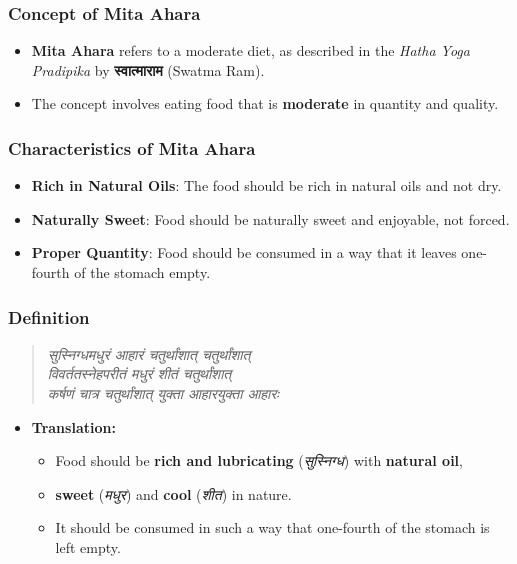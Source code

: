 \begin{frame}[fragile]\frametitle{Concept of Mita Ahara}
    \begin{itemize}
        \item \textbf{Mita Ahara} refers to a moderate diet, as described in the \textit{Hatha Yoga Pradipika} by \textbf{स्वात्माराम} (Swatma Ram).
        \item The concept involves eating food that is \textbf{moderate} in quantity and quality.
    \end{itemize}
\end{frame}

\begin{frame}[fragile]\frametitle{Characteristics of Mita Ahara}
    \begin{itemize}
        \item \textbf{Rich in Natural Oils}: The food should be rich in natural oils and not dry.
        \item \textbf{Naturally Sweet}: Food should be naturally sweet and enjoyable, not forced.
        \item \textbf{Proper Quantity}: Food should be consumed in a way that it leaves one-fourth of the stomach empty.
    \end{itemize}
\end{frame}

\begin{frame}[fragile]\frametitle{Definition}
    \begin{quote}
        \textit{सुस्निग्धमधुरं आहारं चतुर्थांशात् चतुर्थांशात् \\ 
        विवर्ततस्नेहपरीतं मधुरं शीतं चतुर्थांशात्} \\ 
        \textit{कर्षणं चात्र चतुर्थांशात् युक्ता आहारयुक्ता आहारः}
    \end{quote}
    \begin{itemize}
        \item \textbf{Translation:}
        \begin{itemize}
            \item Food should be \textbf{rich and lubricating} (\textit{सुस्निग्ध}) with \textbf{natural oil}, 
            \item \textbf{sweet} (\textit{मधुर}) and \textbf{cool} (\textit{शीत}) in nature.
            \item It should be consumed in such a way that one-fourth of the stomach is left empty.
        \end{itemize}
    \end{itemize}
\end{frame}

